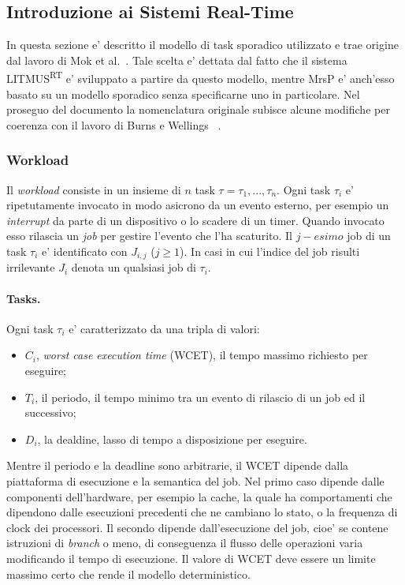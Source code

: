 \subsection{Introduzione ai Sistemi Real-Time}
\label{sec:overviewRTS}

In questa sezione e' descritto il modello di task sporadico utilizzato e trae origine dal lavoro di Mok et al.~\cite{Sha:2004:RTS:1028913.1028959}. Tale scelta e' dettata dal fatto che il sistema LITMUS\textsuperscript{RT} e' sviluppato a partire da questo modello, mentre MrsP e' anch'esso basato su un modello sporadico senza specificarne uno in particolare. Nel proseguo del documento la nomenclatura originale subisce alcune modifiche per coerenza con il lavoro di Burns e Wellings ~\cite{Burns:2013:SCM:2547348.2547350}.

\subsubsection{Workload}
\label{sec:overviewWL}

Il \textit{workload} consiste in un insieme di $n$ task $\tau = {\tau_1, ... , \tau_n}$. Ogni task $\tau_i$ e' ripetutamente invocato in modo asicrono da un evento esterno, per esempio un \textit{interrupt} da parte di un dispositivo o lo scadere di un timer. Quando invocato esso rilascia un \textit{job} per gestire l'evento che l'ha scaturito. Il $j-esimo$ job di un task $\tau_i$ e' identificato con $J_{i,j}$ ($j \geq 1$). In casi in cui l'indice del job risulti irrilevante $J_i$ denota un qualsiasi job di $\tau_i$.\\

\paragraph{Tasks.} Ogni task $\tau_i$ e' caratterizzato da una tripla di valori:\\
\begin{itemize}
	\item $C_i$, \textit{worst case execution time} (WCET), il tempo massimo richiesto per eseguire;
	\item $T_i$, il periodo, il tempo minimo tra un evento di rilascio di un job ed il successivo;
	\item $D_i$, la dealdine, lasso di tempo a disposizione per eseguire.\\
\end{itemize}

Mentre il periodo e la deadline sono arbitrarie, il WCET dipende dalla piattaforma di esecuzione e la semantica del job. Nel primo caso dipende dalle componenti dell'hardware, per esempio la cache, la quale ha comportamenti che dipendono dalle esecuzioni precedenti che ne cambiano lo stato, o la frequenza di clock dei processori. Il secondo dipende dall'esecuzione del job, cioe' se contene istruzioni di \textit{branch} o meno, di conseguenza il flusso delle operazioni varia modificando il tempo di esecuzione. Il valore di WCET deve essere un limite massimo certo che rende il modello deterministico.\\

